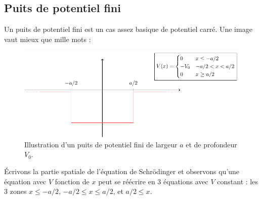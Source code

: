 \documentclass{book}
\begin{document}
\subsection{Puits de potentiel fini}
Un puits de potentiel fini est un cas assez basique de potentiel carré. Une image vaut mieux que mille mots :

\begin{figure}[h]
  \centering
  \includegraphics[scale=0.8]{images/puits_potentiel_fini.pdf}
  \caption{Illustration d'un puits de potentiel fini de largeur $a$ et de profondeur $V_0$.}
  \label{fig:chap2-potentiel_fini}
\end{figure}



Écrivons la partie spatiale de l'équation de Schrödinger et observons qu'une équation avec $V$ fonction de $x$ peut se réécrire en 3 équations avec $V$ constant : les 3 zones $x\leq -a/2$, $-a/2\leq x\leq a/2$, et $a/2 \leq x$.

\end{document}
